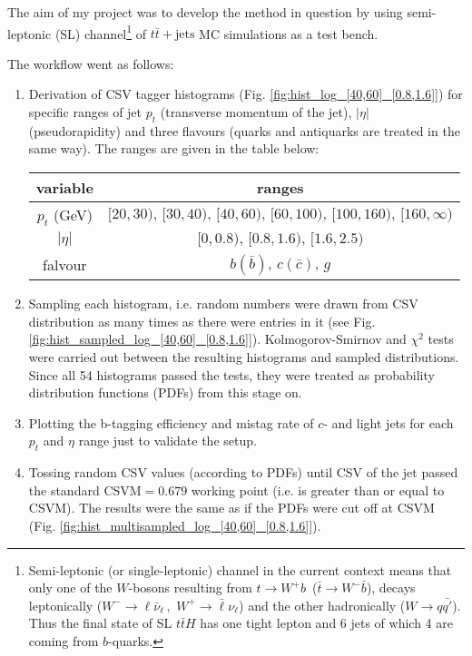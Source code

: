 \documentclass[12pt,a4paper]{article}
\begin{document}
The aim of my project was to develop the method in question by using semi-leptonic (SL) channel\footnote{Semi-leptonic (or single-leptonic) channel in the current context means that only one of the $W$-bosons resulting from $t\to W^+b\,$ ($\bar{t}\to W^-\bar{b}$), decays leptonically ($W^-\to \mathcal{\ell}\bar{\nu}_\mathcal{\ell}\,,\,\,W^+\to \bar{\mathcal{\ell}}\nu_\mathcal{\ell}$) and the other hadronically ($W\to q\bar{q'}$). Thus the final state of SL $t\bar{t}H$ has one tight lepton and 6 jets of which 4 are coming from $b$-quarks.}
of $t\bar{t}+\mbox{jets}$ MC simulations as a test bench.

\noindent The workflow went as follows:
\begin{enumerate}
\item Derivation of CSV tagger histograms (Fig. \ref{fig:hist_log_[40,60]_[0.8,1.6]}) for specific ranges of jet $p_t$ (transverse momentum of the jet), $|\eta|$ (pseudorapidity) and three flavours (quarks and antiquarks are treated in the same way).
The ranges are given in the table below:
\begin{center}
	\begin{tabular}{ c | c }
		\hline
		variable & ranges \\ \hline
		$p_t$ (GeV) & $[20,30),\,[30,40),\,[40,60),\,[60,100),\,[100,160),\,[160,\infty)$ \\ \hline
		$|\eta|$ & $[0,0.8),\,[0.8,1.6),\,[1.6,2.5)$ \\ \hline
		falvour & $b(\bar{b})$, $c(\bar{c})$, $g$ \\
	\end{tabular}
\end{center}
\item Sampling each histogram, i.e. random numbers were drawn from CSV distribution as many times as there were entries in it (see Fig. \ref{fig:hist_sampled_log_[40,60]_[0.8,1.6]}).
Kolmogorov-Smirnov and $\chi^2$ tests were carried out between the resulting histograms and sampled distributions.
Since all 54 histograms passed the tests, they were treated as probability distribution functions (PDFs) from this stage on.
\item Plotting the b-tagging efficiency and mistag rate of $c$- and light jets for each $p_t$ and $\eta$ range just to validate the setup.
\item Tossing random CSV values (according to PDFs) until CSV of the jet passed the standard $\mbox{CSVM}=0.679$ working point (i.e. is greater than or equal to CSVM).
The results were the same as if the PDFs were cut off at CSVM (Fig. \ref{fig:hist_multisampled_log_[40,60]_[0.8,1.6]}).

\end{enumerate}
\end{document}
